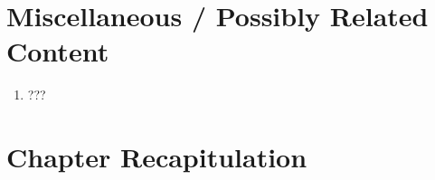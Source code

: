 \documentclass[thesis-solanki.tex]{subfiles}
\begin{document}
\section{Miscellaneous / Possibly Related Content}
\begin{enumerate}
\item ???
\end{enumerate}



\section{Chapter Recapitulation}

\ifMain
\begin{scope}
  \nolinenumbers
  \enotesize
  \par
  \begin{singlespace}
  \setlength{\parskip}{12pt plus 2pt minus 1pt}
  \theendnotes
  \par
  \end{singlespace}
\end{scope}
\fi
\end{document}
